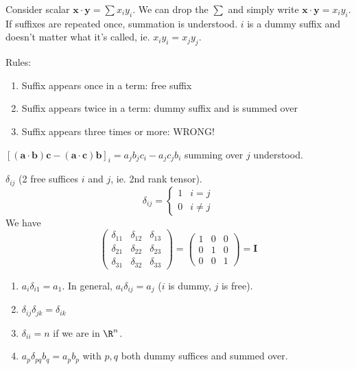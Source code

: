 \documentclass[a4paper]{article}
\begin{document}
\begin{notation}
  Consider scalar $\mathbf{x\cdot y} = \sum x_iy_i$. We can drop the $\sum$ and simply write $\mathbf{x\cdot y} = x_iy_i$. If suffixes are repeated once, summation is understood. $i$ is a dummy suffix and doesn't matter what it's called, ie. $x_iy_i = x_jy_j$.

  Rules:
  \begin{enumerate}
    \item Suffix appears once in a term: free suffix
    \item Suffix appears twice in a term: dummy suffix and is summed over
    \item Suffix appears three times or more: WRONG!
  \end{enumerate}
\end{notation}

\begin{eg}
  $[\mathbf{(a\cdot b)c - (a \cdot c)b}]_i = a_jb_jc_i - a_jc_jb_i$ summing over $j$ understood.
\end{eg}

\begin{defi}
  $\delta_{ij}$ (2 free suffices $i$ and $j$, ie. 2nd rank tensor).
  \[
    \delta_{ij} = 
    \begin{cases}
      1 & i = j\\
      0 & i\not=j
    \end{cases}
  \]
  We have
  \[
    \begin{pmatrix}
      \delta_{11} & \delta_{12} & \delta_{13}\\
      \delta_{21} & \delta_{22} & \delta_{23}\\
      \delta_{31} & \delta_{32} & \delta_{33}
    \end{pmatrix} =
    \begin{pmatrix}
      1 & 0 & 0\\
      0 & 1 & 0\\
      0 & 0 & 1
    \end{pmatrix}
    = \mathbf{I}
  \]
\end{defi}

\begin{eg}\leavevmode
  \begin{enumerate}
    \item $a_i\delta_{i1} = a_1$. In general, $a_i\delta_{ij} = a_j$ ($i$ is dummy, $j$ is free).
    \item $\delta_{ij}\delta_{jk} = \delta_{ik}$
    \item $\delta_{ii} = n$ if we are in $\R^n$.
    \item $a_p\delta_{pq}b_q = a_pb_p$ with $p, q$ both dummy suffices and summed over.
  \end{enumerate}
\end{eg}
\end{document}
